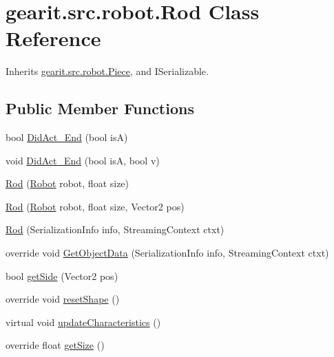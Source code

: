 \hypertarget{classgearit_1_1src_1_1robot_1_1_rod}{\section{gearit.\+src.\+robot.\+Rod Class Reference}
\label{classgearit_1_1src_1_1robot_1_1_rod}
}


Inherits \hyperlink{classgearit_1_1src_1_1robot_1_1_piece}{gearit.\+src.\+robot.\+Piece}, and I\+Serializable.

\subsection*{Public Member Functions}
\begin{DoxyCompactItemize}
\item 
bool \hyperlink{classgearit_1_1src_1_1robot_1_1_rod_a0358d66da5cf9d4fa380d2ea336baad3}{Did\+Act\+\_\+\+End} (bool is\+A)
\item 
void \hyperlink{classgearit_1_1src_1_1robot_1_1_rod_af8c8d1059a5c66c2c47bba128adddfed}{Did\+Act\+\_\+\+End} (bool is\+A, bool v)
\item 
\hyperlink{classgearit_1_1src_1_1robot_1_1_rod_a670535a0c2e627522f771051dcb15179}{Rod} (\hyperlink{classgearit_1_1src_1_1robot_1_1_robot}{Robot} robot, float size)
\item 
\hyperlink{classgearit_1_1src_1_1robot_1_1_rod_a7692945c15925cb9adbe384be4a0b2a6}{Rod} (\hyperlink{classgearit_1_1src_1_1robot_1_1_robot}{Robot} robot, float size, Vector2 pos)
\item 
\hyperlink{classgearit_1_1src_1_1robot_1_1_rod_a39d72807f81c6fd7d34bbd06e350efd8}{Rod} (Serialization\+Info info, Streaming\+Context ctxt)
\item 
override void \hyperlink{classgearit_1_1src_1_1robot_1_1_rod_aeaf2dd011a484e591bd8d977fe62ac52}{Get\+Object\+Data} (Serialization\+Info info, Streaming\+Context ctxt)
\item 
bool \hyperlink{classgearit_1_1src_1_1robot_1_1_rod_aae7868bc7247dde099ac6884ca3b2390}{get\+Side} (Vector2 pos)
\item 
override void \hyperlink{classgearit_1_1src_1_1robot_1_1_rod_aecff9e164fdba30916c6afa5db2e6a4f}{reset\+Shape} ()
\item 
virtual void \hyperlink{classgearit_1_1src_1_1robot_1_1_rod_ae3c886a97641a5c5911153a1848c8647}{update\+Characteristics} ()
\item 
override float \hyperlink{classgearit_1_1src_1_1robot_1_1_rod_acafc38899bd84e8b2316bc9be3210fe0}{get\+Size} ()

\end{DoxyCompactItemize}
